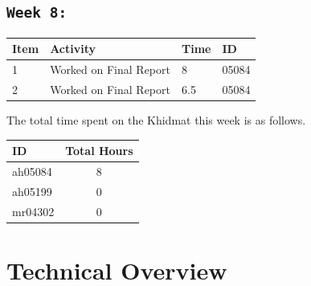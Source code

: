 \documentclass[11pt]{article}
\begin{document}
\subsection{\texttt{Week 8: }}
\begin{center}
\begin{tabular}{|l|l|l|l|}
  \hline
  \textbf{Item} 	& \textbf{Activity} & \textbf{Time} & \textbf{ID} \\\hline
  1 & Worked on Final Report & 8 & 05084 \\ \hline
  2 & Worked on Final Report & 6.5 & 05084 \\ \hline
  
\end{tabular}
    
\end{center}
The total time spent on the Khidmat this week is as follows.    
\begin{center}
\begin{tabular}{|l|c|}
  \hline
  \textbf{ID} & \textbf{Total Hours}\\\hline
  ah05084 & 8 \\\hline
  ah05199 & 0 \\\hline
  mr04302 & 0 \\\hline
\end{tabular}
\end{center}
\newpage

\section{Technical Overview}
\end{document}
